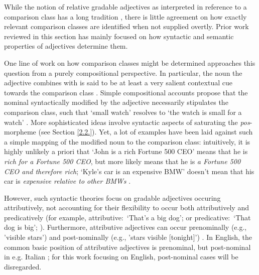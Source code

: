 While the notion of relative gradable adjectives as interpreted in reference to a comparison class has a long tradition \parencite[e.g.,][]{bartsch1972, Bierwisch1989}, there is little agreement on how exactly relevant comparison classes are identified when not supplied overtly. Prior work reviewed in this section has mainly focused on how syntactic and semantic properties of adjectives determine them.

One line of work on how comparison classes might be determined approaches this question from a purely compositional perspective. In particular, the noun the adjective combines with is said to be at least a very salient contextual cue towards the comparison class \parencite{Kamp1975}. 
Simple compositional accounts propose that the nominal syntactically modified by the adjective necessarily stipulates the comparison class, such that ‘small watch’ resolves to ‘the watch is small for a watch’ \parencite{Kamp1975, Cresswell1976}. More sophisticated ideas involve syntactic aspects of saturating the \textit{pos}-morpheme (see Section \ref{2.2.}).
Yet, a lot of examples have been laid against such a simple mapping of the modified noun to the comparison class: intuitively, it is highly unlikely a priori that ‘John is a rich Fortune 500 CEO’ means that he is \emph{rich for a Fortune 500 CEO}, but more likely means that he is \emph{a Fortune 500 CEO and therefore rich}; ‘Kyle’s car is an expensive BMW’ doesn’t mean that his car is \emph{expensive relative to other BMWs} \parencite{Kennedy2007}. 

However, such syntactic theories focus on gradable adjectives occuring attributively, not accounting for their flexibility to occur both attributively and predicatively (for example, attributive:~‘That’s a big dog’; or predicative:~‘That dog is big’; \textcite[cf.][]{mcnally2008, hofherr2010adjectives}). Furthermore, attributive adjectives can occur prenominally (e.g., 'visible stars') and post-nominally (e.g., 'stars visible [tonight]') \parencite{hofherr2010adjectives}. In English, the common basic position of attributive adjectives is prenominal, but post-nominal in e.g. Italian \parencite{cinque2010}; for this work focusing on English, post-nominal cases will be disregarded. 
  
